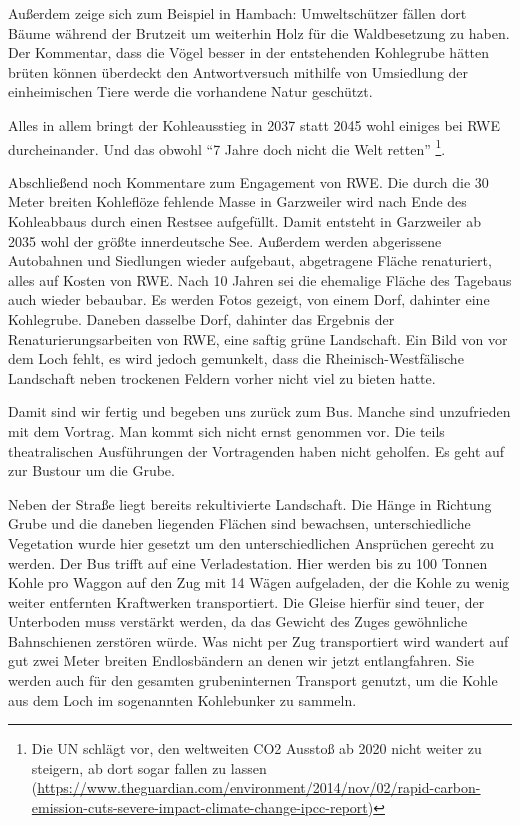 \documentclass{article}
\begin{document}
Außerdem zeige sich zum Beispiel in Hambach: Umweltschützer fällen dort Bäume während der Brutzeit um weiterhin
Holz für die Waldbesetzung zu haben.
Der Kommentar, dass die Vögel besser in der entstehenden Kohlegrube hätten brüten können überdeckt den Antwortversuch
mithilfe von Umsiedlung der einheimischen Tiere werde die vorhandene Natur geschützt.

Alles in allem bringt der Kohleausstieg in 2037 statt 2045 wohl einiges bei RWE durcheinander.
Und das obwohl \enquote{7 Jahre doch nicht die Welt retten} \footnote{Die UN schlägt vor, den weltweiten CO2 Ausstoß ab 2020 nicht weiter zu steigern, ab dort sogar fallen zu lassen (\url{https://www.theguardian.com/environment/2014/nov/02/rapid-carbon-emission-cuts-severe-impact-climate-change-ipcc-report})}.

Abschließend noch Kommentare zum Engagement von RWE.
Die durch die 30 Meter breiten Kohleflöze fehlende Masse in Garzweiler wird nach Ende des Kohleabbaus durch einen Restsee aufgefüllt.
Damit entsteht in Garzweiler ab 2035 wohl der größte innerdeutsche See.
Außerdem werden abgerissene Autobahnen und Siedlungen wieder aufgebaut, abgetragene Fläche renaturiert, 
alles auf Kosten von RWE.
Nach 10 Jahren sei die ehemalige Fläche des Tagebaus auch wieder bebaubar.
Es werden Fotos gezeigt, von einem Dorf, dahinter eine Kohlegrube.
Daneben dasselbe Dorf, dahinter das Ergebnis der Renaturierungsarbeiten von RWE, eine saftig grüne Landschaft.
Ein Bild von vor dem Loch fehlt, es wird jedoch gemunkelt, dass die Rheinisch-Westfälische Landschaft neben trockenen
Feldern vorher nicht viel zu bieten hatte.

Damit sind wir fertig und begeben uns zurück zum Bus.
Manche sind unzufrieden mit dem Vortrag. Man kommt sich nicht ernst genommen vor.
Die teils theatralischen Ausführungen der Vortragenden haben nicht geholfen.
Es geht auf zur Bustour um die Grube.

Neben der Straße liegt bereits rekultivierte Landschaft.
Die Hänge in Richtung Grube und die daneben liegenden Flächen sind bewachsen,
unterschiedliche Vegetation wurde hier gesetzt um den unterschiedlichen Ansprüchen gerecht zu werden.
Der Bus trifft auf eine Verladestation.
Hier werden bis zu 100 Tonnen Kohle pro Waggon auf den Zug mit 14 Wägen aufgeladen,
der die Kohle zu wenig weiter entfernten Kraftwerken transportiert.
Die Gleise hierfür sind teuer, der Unterboden muss verstärkt werden, da das Gewicht
des Zuges gewöhnliche Bahnschienen zerstören würde.
Was nicht per Zug transportiert wird wandert auf gut zwei Meter breiten Endlosbändern
an denen wir jetzt entlangfahren.
Sie werden auch für den gesamten grubeninternen Transport genutzt, um die Kohle aus dem Loch
im sogenannten Kohlebunker zu sammeln.
\end{document}
